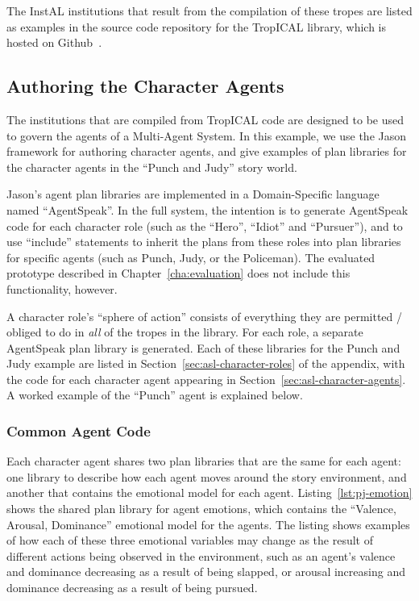 \documentclass[11pt]{report}
\begin{document}
The InstAL institutions that result from the compilation of these tropes are
listed as examples in the source code repository for the TropICAL library, which
is hosted on Github~\citep{tropical}.

\subsection{Authoring the Character Agents}
The institutions that are compiled from TropICAL code are designed to be used to
govern the agents of a Multi-Agent System. In this example, we use the
Jason~\citep{bordini2007programming} framework for authoring character agents,
and give examples of plan libraries for the character agents in the ``Punch and
Judy'' story world.

Jason's agent plan libraries are implemented in a Domain-Specific language named
``AgentSpeak''. In the full system, the intention is to generate AgentSpeak code
for each character role (such as the ``Hero'', ``Idiot'' and ``Pursuer''), and
to use ``include'' statements to inherit the plans from these roles into plan
libraries for specific agents (such as Punch, Judy, or the Policeman). The
evaluated prototype described in Chapter~\ref{cha:evaluation} does not include
this functionality, however.

A character role's ``sphere of action'' consists of everything they are
permitted / obliged to do in \emph{all} of the tropes in the library. For each
role, a separate AgentSpeak plan library is generated. Each of these libraries
for the Punch and Judy example are listed in
Section~\ref{sec:asl-character-roles} of the appendix, with the code for each
character agent appearing in Section~\ref{sec:asl-character-agents}. A worked
example of the ``Punch'' agent is explained below.

\subsubsection{Common Agent Code}
Each character agent shares two plan libraries that are the same for each agent:
one library to describe how each agent moves around the story environment, and
another that contains the emotional model for each agent.
Listing~\ref{lst:pj-emotion} shows the shared plan library for agent emotions,
which contains the ``Valence, Arousal, Dominance'' emotional model for the
agents. The listing shows examples of how each of these three emotional
variables may change as the result of different actions being observed in the
environment, such as an agent's valence and dominance decreasing as a result of
being slapped, or arousal increasing and dominance decreasing as a result of
being pursued.
\end{document}

